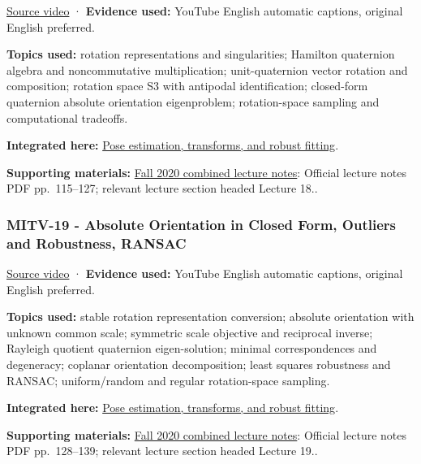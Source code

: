 \href{https://www.youtube.com/watch?v=uiG6KY0Cqd8}{Source video} · \textbf{Evidence used:} YouTube English automatic captions, original English preferred.

\textbf{Topics used:} rotation representations and singularities; Hamilton quaternion algebra and noncommutative multiplication; unit-quaternion vector rotation and composition; rotation space S3 with antipodal identification; closed-form quaternion absolute orientation eigenproblem; rotation-space sampling and computational tradeoffs.

\textbf{Integrated here:} \hyperref[04-visual-computing-ii-ch032-pose-estimation-transforms-and-robust-fitting]{Pose estimation, transforms, and robust fitting}.

\textbf{Supporting materials:} \href{https://ocw.mit.edu/courses/6-801-machine-vision-fall-2020/9ec44f69e72995c370b3797818ba01e6_MIT6_801F20_lectureNotes.pdf}{Fall 2020 combined lecture notes}: Official lecture notes PDF pp.~115--127; relevant lecture section headed Lecture 18..

\subsubsection{MITV-19 - Absolute Orientation in Closed Form, Outliers and Robustness, RANSAC}\label{04-visual-computing-ii-ch036-mitv-19---absolute-orientation-in-closed-form-outliers-and-robustness-ransac}

\href{https://www.youtube.com/watch?v=kigLhcTm_gg}{Source video} · \textbf{Evidence used:} YouTube English automatic captions, original English preferred.

\textbf{Topics used:} stable rotation representation conversion; absolute orientation with unknown common scale; symmetric scale objective and reciprocal inverse; Rayleigh quotient quaternion eigen-solution; minimal correspondences and degeneracy; coplanar orientation decomposition; least squares robustness and RANSAC; uniform/random and regular rotation-space sampling.

\textbf{Integrated here:} \hyperref[04-visual-computing-ii-ch032-pose-estimation-transforms-and-robust-fitting]{Pose estimation, transforms, and robust fitting}.

\textbf{Supporting materials:} \href{https://ocw.mit.edu/courses/6-801-machine-vision-fall-2020/9ec44f69e72995c370b3797818ba01e6_MIT6_801F20_lectureNotes.pdf}{Fall 2020 combined lecture notes}: Official lecture notes PDF pp.~128--139; relevant lecture section headed Lecture 19..

